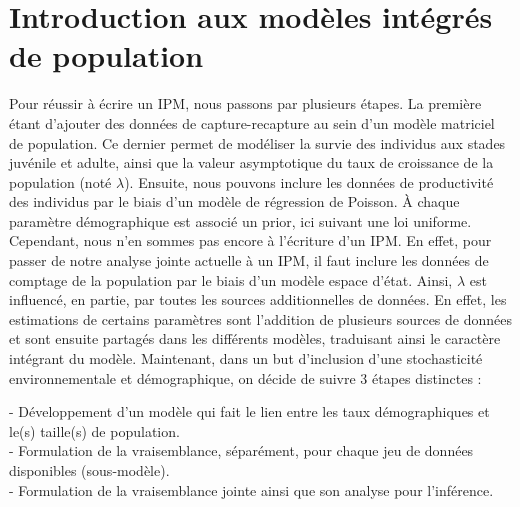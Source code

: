 \documentclass[12pt,a4paper]{article}
\begin{document}
\section{Introduction aux modèles intégrés de population}
Pour réussir à écrire un IPM, nous passons par plusieurs étapes. La première étant d'ajouter des données de capture-recapture au sein d'un modèle matriciel de population. Ce dernier permet de modéliser la survie des individus aux stades juvénile et adulte, ainsi que la valeur asymptotique du taux de croissance de la population (noté $\lambda$). Ensuite, nous pouvons inclure les données de productivité des individus par le biais d'un modèle de régression de Poisson. À chaque paramètre démographique est associé un prior, ici suivant une loi uniforme. Cependant, nous n'en sommes pas encore à l'écriture d'un IPM. En effet, pour passer de notre analyse jointe actuelle à un IPM, il faut inclure les données de comptage de la population par le biais d'un modèle espace d'état. Ainsi, $\lambda$ est influencé, en partie, par toutes les sources additionnelles de données. En effet, les estimations de certains paramètres sont l'addition de plusieurs sources de données et sont ensuite partagés dans les différents modèles, traduisant ainsi le caractère intégrant du modèle.
Maintenant, dans un but d'inclusion d'une stochasticité environnementale et démographique, on décide de suivre 3 étapes distinctes :

- Développement d'un modèle qui fait le lien entre les taux démographiques et le(s) taille(s) de population.\\

- Formulation de la vraisemblance, séparément, pour chaque jeu de données disponibles (sous-modèle). \\

- Formulation de la vraisemblance jointe ainsi que son analyse pour l'inférence.\\
\end{document}
